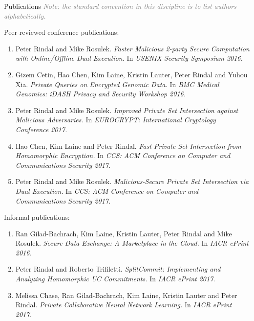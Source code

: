 \documentclass{resume} %
\begin{document}
\begin{rSection}{Publications}
\hfill {\scriptsize \textcolor{gray}{\emph{Note: the standard convention in this discipline is to list authors alphabetically.}}}

Peer-reviewed conference publications:
\begin{enumerate}[label=C\arabic*]
	
	\item Peter Rindal and Mike Rosulek. \emph{Faster Malicious 2-party Secure Computation with Online/Offline Dual Execution.} In \emph{USENIX Security Symposium 2016.}
	
	\item Gizem Cetin, Hao Chen, Kim Laine, Kristin Lauter, Peter Rindal and Yuhou Xia. \emph{Private Queries on Encrypted Genomic Data.} In \emph{BMC Medical Genomics:  iDASH Privacy and Security Workshop 2016.}
		
	\item Peter Rindal and Mike Rosulek. \emph{Improved Private Set Intersection against Malicious Adversaries.} In \emph{EUROCRYPT: International Cryptology Conference 2017.}
	
	\item Hao Chen, Kim Laine and Peter Rindal. \emph{Fast Private Set Intersection from Homomorphic Encryption.} In \emph{CCS: ACM Conference on Computer and Communications Security 2017.}
	
	\item Peter Rindal and Mike Rosulek. \emph{Malicious-Secure Private Set Intersection via Dual Execution.} In \emph{CCS: ACM Conference on Computer and Communications Security 2017.}
\end{enumerate}

\bigskip 

Informal publications:
\begin{enumerate}[label=I\arabic*]
	
	\item Ran Gilad-Bachrach, Kim Laine, Kristin Lauter, Peter Rindal and Mike Rosulek. \emph{Secure Data Exchange: A Marketplace in the Cloud.} In \emph{IACR ePrint 2016.}
		
	\item Peter Rindal and Roberto Trifiletti. \emph{SplitCommit: Implementing and Analyzing Homomorphic UC Commitments.} In \emph{IACR ePrint 2017.}
	
	\item Melissa Chase, Ran Gilad-Bachrach, Kim Laine, Kristin Lauter and Peter Rindal. \emph{Private Collaborative Neural Network Learning.} In \emph{IACR ePrint 2017.}
\end{enumerate}
 

\end{rSection}
\end{document}

